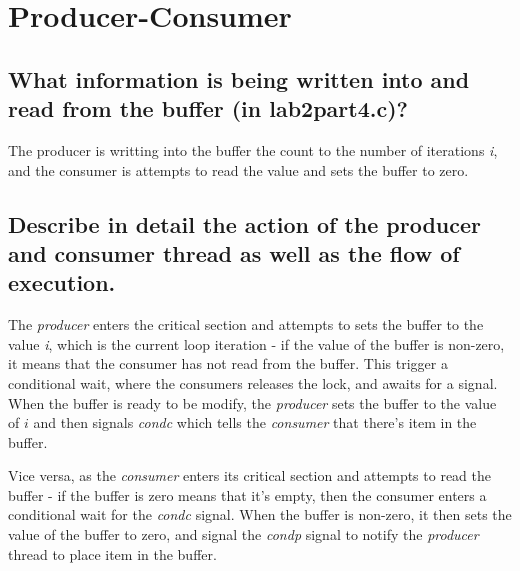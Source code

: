 


\section{Producer-Consumer}


\subsection{What information is being written into and read from the buffer (in lab2part4.c)?}

The producer is writting into the buffer the count to the number of iterations \emph{i}, and the consumer
is attempts to read the value and sets the buffer to zero.


\subsection{Describe in detail the action of the producer and consumer thread as well as the flow of execution.}

The \emph{producer} enters the critical section and attempts to sets the buffer to the value \emph{i}, 
which is the current loop iteration - if the value of the buffer is non-zero, it means that the consumer 
has not read from the buffer. This trigger a conditional wait, where the consumers releases the lock,
and awaits for a signal. When the buffer is ready to be modify, the \emph{producer} sets the buffer to
the value of $i$ and then signals \emph{condc} which tells the \emph{consumer} that there's item in the
buffer.

Vice versa, as the \emph{consumer} enters its critical section and attempts to read the buffer - if the buffer is
zero means that it's empty, then the consumer enters a conditional wait for the \emph{condc} signal. When
the buffer is non-zero, it then sets the value of the buffer to zero, and signal the \emph{condp} signal to
notify the \emph{producer} thread to place item in the buffer.


